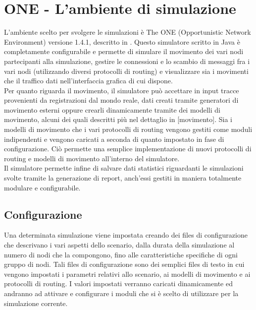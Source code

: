 
\chapter{ONE - L'ambiente di simulazione}\label{simulatore} %



\graphicspath{{2-simulatore/img/}}


L'ambiente scelto per svolgere le simulazioni è The ONE (Opportunistic Network Environment) versione 1.4.1, descritto in \cite{articoloONE}. Questo simulatore scritto in Java è completamente configurabile e permette di simulare il movimento dei vari nodi partecipanti alla simulazione, gestire le connessioni e lo scambio di messaggi fra i vari nodi (utilizzando diversi protocolli di routing) e visualizzare sia i movimenti che il traffico dati nell'interfaccia grafica di cui dispone.
\\

Per quanto riguarda il movimento, il simulatore può accettare in input tracce provenienti da registrazioni dal mondo reale, dati creati tramite generatori di movimento esterni oppure crearli dinamicamente tramite dei modelli di movimento, alcuni dei quali descritti più nel dettaglio in [movimento]. Sia i modelli di movimento che i vari protocolli di routing vengono gestiti come moduli indipendenti e vengono caricati a seconda di quanto impostato in fase di configurazione. Ciò permette una semplice implementazione di nuovi protocolli di routing e modelli di movimento all'interno del simulatore.
\\

Il simulatore permette infine di salvare dati statistici riguardanti le simulazioni svolte tramite la generazione di report, anch'essi gestiti in maniera totalmente modulare e configurabile.
\\

\section{Configurazione}
Una determinata simulazione viene impostata creando dei files di configurazione che descrivano i vari aspetti dello scenario, dalla durata della simulazione al numero di nodi che la compongono, fino alle caratteristiche specifiche di ogni gruppo di nodi. Tali files di configurazione sono dei semplici files di testo in cui vengono impostati i parametri relativi allo scenario, ai modelli di movimento e ai protocolli di routing. I valori impostati verranno caricati dinamicamente ed andranno ad attivare e configurare i moduli che si è scelto di utilizzare per la simulazione corrente.
\\

